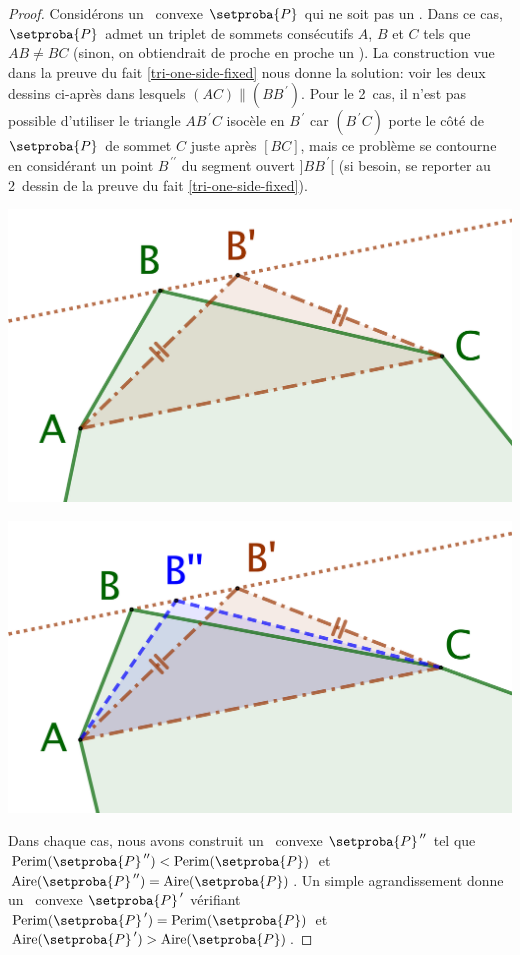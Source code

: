 \begin{proof}
	Considérons un \ngone\ convexe $\setproba{P}$ qui ne soit pas un \nequi.
	Dans ce cas, $\setproba{P}$ admet un triplet de sommets consécutifs $A$, $B$ et $C$ tels que $AB \neq BC$ (sinon, on obtiendrait de proche en proche un \nequi).
	La construction vue dans la preuve du fait \ref{tri-one-side-fixed} nous donne la solution: voir les deux dessins ci-après dans lesquels $(AC) \parallel (BB^{\,\prime})$.
	Pour le 2\ieme\ cas, il n'est pas possible d'utiliser le triangle $AB^{\,\prime}C$ isocèle en $B^{\,\prime}$ car $(B^{\,\prime}C)$ porte le côté de $\setproba{P}$ de sommet $C$ juste après $[BC]$, mais ce problème se contourne en considérant un point $B^{\,\prime\prime}$ du segment ouvert $]BB^{\,\prime}[$ (si besoin, se reporter au 2\ieme\ dessin de la preuve du fait \ref{tri-one-side-fixed}).
	\begin{multicols}{2}
		\centering

		\includegraphics[scale=.4]{content/polygon/necessary-cond/not-iso-OK.png}

		\includegraphics[scale=.4]{content/polygon/necessary-cond/not-iso-KO.png}
	\end{multicols}

	Dans chaque cas, nous avons construit un \ngone\ convexe $\setproba{P}^{\,\prime\prime}$ tel que
	$\perim{\setproba{P}^{\,\prime\prime}} < \perim{\setproba{P}}$
	et
	$\area{\setproba{P}^{\,\prime\prime}} = \area{\setproba{P}}$.
	Un simple agrandissement donne un \ngone\ convexe $\setproba{P}^{\,\prime}$ vérifiant
	$\perim{\setproba{P}^{\,\prime}} = \perim{\setproba{P}}$
	et
	$\area{\setproba{P}^{\,\prime}} > \area{\setproba{P}}$.
\end{proof}


